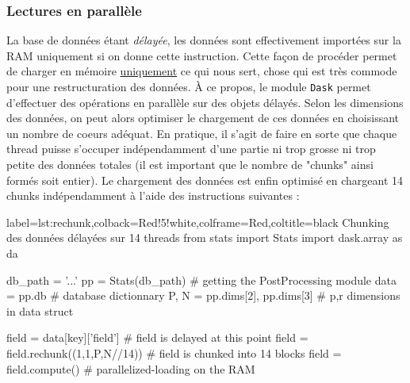 \documentclass[13pt, a4paper]{extarticle}
\begin{document}
\subsubsection{Lectures en parallèle}
\noindent La base de données étant \emph{délayée}, les données
sont effectivement importées sur la RAM uniquement si on donne cette instruction.
Cette façon de procéder permet de charger en mémoire \ul{uniquement} ce qui nous sert, chose
qui est très commode pour une restructuration des données.
À ce propos, le module \texttt{Dask} permet d'effectuer des opérations en parallèle
sur des objets délayés. Selon les dimensions des données, on peut alors optimiser
le chargement de ces données en choisissant un nombre de coeurs adéquat. En pratique, 
il s'agit de faire en sorte que chaque thread puisse s'occuper indépendamment
d'une partie ni trop grosse ni trop petite des données totales (il est important 
que le nombre de "chunks" ainsi
formés soit entier). 
Le chargement des données est enfin optimisé en chargeant 14 chunks indépendamment
à l'aide des instructions suivantes :
\vspace{.2cm}

\noindent\begin{pythoncode}{label=lst:rechunk,colback=Red!5!white,colframe=Red,coltitle=black}
  {Chunking des données délayées sur 14 threads}
  from stats import Stats
  import dask.array as da

  db_path = '...'
  pp = Stats(db_path)                  # getting the PostProcessing module
  data = pp.db                         # database dictionnary
  P, N = pp.dims[2], pp.dims[3]        # p,r dimensions in data struct

  field = data[key]['field']           # field is delayed at this point
  field = field.rechunk((1,1,P,N//14)) # field is chunked into 14 blocks
  field = field.compute()              # parallelized-loading on the RAM
\end{pythoncode}
\end{document}
